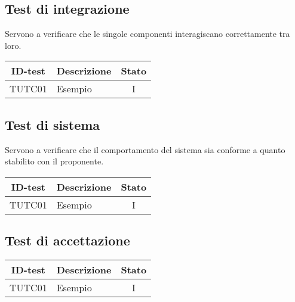 \subsection{Test di integrazione}
Servono a verificare che le singole componenti interagiscano correttamente tra loro.
\begin{tabular}{|c|p{4cm}|c|}
    \hline
    \textbf{ID-test} & \textbf{Descrizione} & \textbf{Stato} \\
    \hline
    TUTC01 & Esempio & I  \\
    \hline
\end{tabular}
\subsection{Test di sistema}
Servono a verificare che il comportamento del sistema sia conforme a quanto stabilito con il proponente.
\begin{tabular}{|c|p{4cm}|c|}
    \hline
    \textbf{ID-test} & \textbf{Descrizione} & \textbf{Stato} \\
    \hline
    TUTC01 & Esempio & I \\
    \hline
\end{tabular}
\subsection{Test di accettazione}
\begin{tabular}{|c|p{4cm}|c|}
    \hline
    \textbf{ID-test} & \textbf{Descrizione} & \textbf{Stato} \\
    \hline
    TUTC01 & Esempio & I \\
    \hline
\end{tabular}
